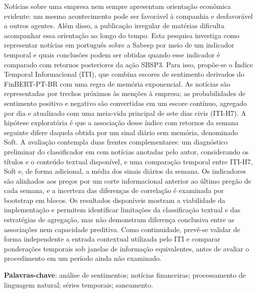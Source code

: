 \begin{resumo}

Notícias sobre uma empresa nem sempre apresentam orientação econômica evidente: um mesmo acontecimento pode ser favorável à companhia e desfavorável a outros agentes. Além disso, a publicação irregular de matérias dificulta acompanhar essa orientação ao longo do tempo. Esta pesquisa investiga como representar notícias em português sobre a Sabesp por meio de um indicador temporal e quais conclusões podem ser obtidas quando esse indicador é comparado com retornos posteriores da ação SBSP3. Para isso, propõe-se o Índice Temporal Informacional (ITI), que combina escores de sentimento derivados do FinBERT-PT-BR com uma regra de memória exponencial. As notícias são representadas por trechos próximos às menções à empresa; as probabilidades de sentimento positivo e negativo são convertidas em um escore contínuo, agregado por dia e atualizado com uma meia-vida principal de sete dias civis (ITI-H7). A hipótese exploratória é que a associação desse índice com retornos da semana seguinte difere daquela obtida por um sinal diário sem memória, denominado Soft. A avaliação contempla duas frentes complementares: um diagnóstico preliminar do classificador em cem notícias anotadas pelo autor, considerando os títulos e o conteúdo textual disponível, e uma comparação temporal entre ITI-H7, Soft e, de forma adicional, a média dos sinais diários da semana. Os indicadores são alinhados aos preços por um corte informacional anterior ao último pregão de cada semana, e a incerteza das diferenças de correlação é examinada por bootstrap em blocos. Os resultados disponíveis mostram a viabilidade da implementação e permitem identificar limitações da classificação textual e das estratégias de agregação, mas não demonstram diferença conclusiva entre as associações nem capacidade preditiva. Como continuidade, prevê-se validar de forma independente a entrada contextual utilizada pelo ITI e comparar ponderações temporais sob janelas de informação equivalentes, antes de avaliar o procedimento em um período ainda não examinado.

\vspace{\onelineskip}

\noindent
\textbf{Palavras-chave}: análise de sentimentos; notícias financeiras; processamento de linguagem natural; séries temporais; saneamento.
\end{resumo}


